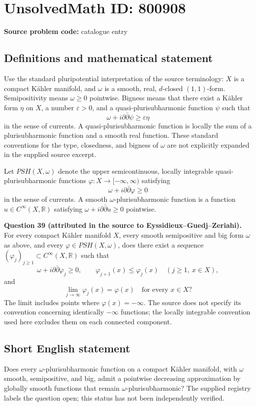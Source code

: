 \documentclass[11pt]{article}
\newcommand{\R}{\mathbb{R}}
\begin{document}
\section*{UnsolvedMath ID: 800908}
\textbf{Source problem code:} catalogue entry
\subsection{Definitions and mathematical statement}
Use the standard pluripotential interpretation of the source terminology: \(X\) is a compact K\"ahler manifold, and \(\omega\) is a smooth, real, \(d\)-closed \((1,1)\)-form. Semipositivity means \(\omega\geq 0\) pointwise. Bigness means that there exist a K\"ahler form \(\eta\) on \(X\), a number \(\varepsilon>0\), and a quasi-plurisubharmonic function \(\psi\) such that
\[
\omega+i\partial\bar\partial\psi\geq\varepsilon\eta
\]
in the sense of currents. A quasi-plurisubharmonic function is locally the sum of a plurisubharmonic function and a smooth real function. These standard conventions for the type, closedness, and bigness of \(\omega\) are not explicitly expanded in the supplied source excerpt.

Let \(PSH(X,\omega)\) denote the upper semicontinuous, locally integrable quasi-plurisubharmonic functions \(\varphi:X\to[-\infty,\infty)\) satisfying
\[
\omega+i\partial\bar\partial\varphi\geq0
\]
in the sense of currents. A smooth \(\omega\)-plurisubharmonic function is a function \(u\in C^\infty(X,\R)\) satisfying \(\omega+i\partial\bar\partial u\geq0\) pointwise.

\textbf{Question 39 (attributed in the source to Eyssidieux--Guedj--Zeriahi).} For every compact K\"ahler manifold \(X\), every smooth semipositive and big form \(\omega\) as above, and every \(\varphi\in PSH(X,\omega)\), does there exist a sequence \((\varphi_j)_{j\geq1}\subset C^\infty(X,\R)\) such that
\[
\omega+i\partial\bar\partial\varphi_j\geq0,\qquad
\varphi_{j+1}(x)\leq\varphi_j(x)
\quad(j\geq1,\ x\in X),
\]
and
\[
\lim_{j\to\infty}\varphi_j(x)=\varphi(x)
\quad\text{for every }x\in X?
\]
The limit includes points where \(\varphi(x)=-\infty\). The source does not specify its convention concerning identically \(-\infty\) functions; the locally integrable convention used here excludes them on each connected component.
\subsection{Short English statement}
Does every \(\omega\)-plurisubharmonic function on a compact K\"ahler manifold, with \(\omega\) smooth, semipositive, and big, admit a pointwise decreasing approximation by globally smooth functions that remain \(\omega\)-plurisubharmonic? The supplied registry labels the question open; this status has not been independently verified.
\end{document}
